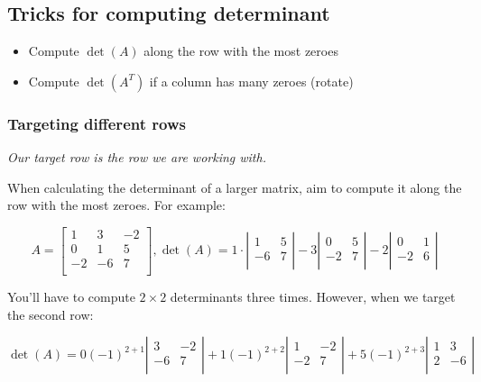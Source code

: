 \documentclass[
]{article}
\newcounter{example}
\begin{document}
\subsection{Tricks for computing
determinant}

\begin{itemize}
\item
  Compute $\det(A)$ along the row with the most zeroes
\item
  Compute $\det\left( A^{T} \right)$ if a column has many zeroes
  (rotate)
\end{itemize}


\subsubsection{Targeting different
rows}

\emph{Our target row is the row we are working with.}

When calculating the determinant of a larger matrix, aim to compute it
along the row with the most zeroes. For example:

$$A = \begin{bmatrix}
1 & 3 & - 2 \\
0 & 1 & 5 \\
 - 2 & - 6 & 7 \\
\end{bmatrix},\det(A) = 1 \cdot \left| \begin{matrix}
1 & 5 \\
 - 6 & 7 \\
\end{matrix} \right| - 3\left| \begin{matrix}
0 & 5 \\
 - 2 & 7 \\
\end{matrix} \right| - 2\left| \begin{matrix}
0 & 1 \\
 - 2 & 6 \\
\end{matrix} \right|$$

You'll have to compute $2 \times 2$ determinants three times. However,
when we target the second row:

$$\det(A) = 0( - 1)^{2 + 1}\left| \begin{matrix}
3 & - 2 \\
 - 6 & 7 \\
\end{matrix} \right| + 1( - 1)^{2 + 2}\left| \begin{matrix}
1 & - 2 \\
 - 2 & 7 \\
\end{matrix} \right| + 5( - 1)^{2 + 3}\left| \begin{matrix}
1 & 3 \\
2 & - 6 \\
\end{matrix} \right|$$
\end{document}
